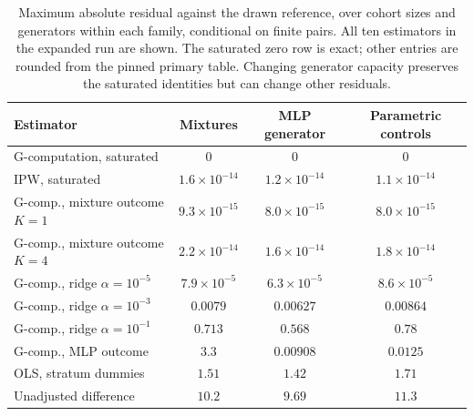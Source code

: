 \begin{table}[htbp]
\small\centering
\caption{Maximum absolute residual against the drawn reference, over cohort
sizes and generators within each family, conditional on finite pairs. All ten
estimators in the expanded run are shown. The saturated zero row is exact;
other entries are rounded from the pinned primary table. Changing generator
capacity preserves the saturated identities but can change other residuals.}
\label{tab:learned}
\begin{tabular}{@{}lccc@{}}
\toprule
Estimator & Mixtures & MLP generator & Parametric controls \\
\midrule
G-computation, saturated & $0$ & $0$ & $0$ \\
IPW, saturated & $1.6\!\times\!10^{-14}$ & $1.2\!\times\!10^{-14}$ & $1.1\!\times\!10^{-14}$ \\
G-comp., mixture outcome $K=1$ & $9.3\!\times\!10^{-15}$ & $8.0\!\times\!10^{-15}$ & $8.0\!\times\!10^{-15}$ \\
G-comp., mixture outcome $K=4$ & $2.2\!\times\!10^{-14}$ & $1.6\!\times\!10^{-14}$ & $1.8\!\times\!10^{-14}$ \\
G-comp., ridge $\alpha=10^{-5}$ & $7.9\!\times\!10^{-5}$ & $6.3\!\times\!10^{-5}$ & $8.6\!\times\!10^{-5}$ \\
G-comp., ridge $\alpha=10^{-3}$ & $0.0079$ & $0.00627$ & $0.00864$ \\
G-comp., ridge $\alpha=10^{-1}$ & $0.713$ & $0.568$ & $0.78$ \\
G-comp., MLP outcome & $3.3$ & $0.00908$ & $0.0125$ \\
OLS, stratum dummies & $1.51$ & $1.42$ & $1.71$ \\
Unadjusted difference & $10.2$ & $9.69$ & $11.3$ \\
\bottomrule
\end{tabular}
\end{table}
